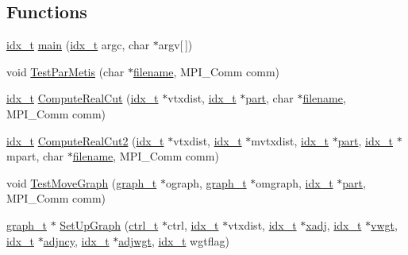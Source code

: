 \subsection*{Functions}
\begin{DoxyCompactItemize}
\item 
\hyperlink{a00876_aaa5262be3e700770163401acb0150f52}{idx\+\_\+t} \hyperlink{a00428_a8f4019835796a39a97c345864d80fcbb}{main} (\hyperlink{a00876_aaa5262be3e700770163401acb0150f52}{idx\+\_\+t} argc, char $\ast$argv\mbox{[}$\,$\mbox{]})
\item 
void \hyperlink{a00428_ac0ca0065f1dc35b0f4fe4d1968313dca}{Test\+Par\+Metis} (char $\ast$\hyperlink{a00623_a42a21beb8018ac623f4d09db1343b9cf}{filename}, M\+P\+I\+\_\+\+Comm comm)
\item 
\hyperlink{a00876_aaa5262be3e700770163401acb0150f52}{idx\+\_\+t} \hyperlink{a00428_a725d56a999dc467b3f7883eea465bab2}{Compute\+Real\+Cut} (\hyperlink{a00876_aaa5262be3e700770163401acb0150f52}{idx\+\_\+t} $\ast$vtxdist, \hyperlink{a00876_aaa5262be3e700770163401acb0150f52}{idx\+\_\+t} $\ast$\hyperlink{a00879_a0a9ea8670f88d6db1e021fee2dcd94be}{part}, char $\ast$\hyperlink{a00623_a42a21beb8018ac623f4d09db1343b9cf}{filename}, M\+P\+I\+\_\+\+Comm comm)
\item 
\hyperlink{a00876_aaa5262be3e700770163401acb0150f52}{idx\+\_\+t} \hyperlink{a00428_a5bf6f2fe30133c3be1dc3d34329e650d}{Compute\+Real\+Cut2} (\hyperlink{a00876_aaa5262be3e700770163401acb0150f52}{idx\+\_\+t} $\ast$vtxdist, \hyperlink{a00876_aaa5262be3e700770163401acb0150f52}{idx\+\_\+t} $\ast$mvtxdist, \hyperlink{a00876_aaa5262be3e700770163401acb0150f52}{idx\+\_\+t} $\ast$\hyperlink{a00879_a0a9ea8670f88d6db1e021fee2dcd94be}{part}, \hyperlink{a00876_aaa5262be3e700770163401acb0150f52}{idx\+\_\+t} $\ast$mpart, char $\ast$\hyperlink{a00623_a42a21beb8018ac623f4d09db1343b9cf}{filename}, M\+P\+I\+\_\+\+Comm comm)
\item 
void \hyperlink{a00428_a136ad3b21ef4f877c3100a997814e8ce}{Test\+Move\+Graph} (\hyperlink{a00734}{graph\+\_\+t} $\ast$ograph, \hyperlink{a00734}{graph\+\_\+t} $\ast$omgraph, \hyperlink{a00876_aaa5262be3e700770163401acb0150f52}{idx\+\_\+t} $\ast$\hyperlink{a00879_a0a9ea8670f88d6db1e021fee2dcd94be}{part}, M\+P\+I\+\_\+\+Comm comm)
\item 
\hyperlink{a00734}{graph\+\_\+t} $\ast$ \hyperlink{a00428_ac5472d28ea064341acff9be6744eea92}{Set\+Up\+Graph} (\hyperlink{a00742}{ctrl\+\_\+t} $\ast$ctrl, \hyperlink{a00876_aaa5262be3e700770163401acb0150f52}{idx\+\_\+t} $\ast$vtxdist, \hyperlink{a00876_aaa5262be3e700770163401acb0150f52}{idx\+\_\+t} $\ast$\hyperlink{a00879_aa8fc7f75458e38e1e2979ed6db639164}{xadj}, \hyperlink{a00876_aaa5262be3e700770163401acb0150f52}{idx\+\_\+t} $\ast$\hyperlink{a00879_a34203f1160d94eca83e95f2718ea3504}{vwgt}, \hyperlink{a00876_aaa5262be3e700770163401acb0150f52}{idx\+\_\+t} $\ast$\hyperlink{a00879_a20c068e3ebdd8f9889fb82c1f677d679}{adjncy}, \hyperlink{a00876_aaa5262be3e700770163401acb0150f52}{idx\+\_\+t} $\ast$\hyperlink{a00879_a2be4719baa820cfa5c06fd070796e0d3}{adjwgt}, \hyperlink{a00876_aaa5262be3e700770163401acb0150f52}{idx\+\_\+t} wgtflag)
\end{DoxyCompactItemize}


